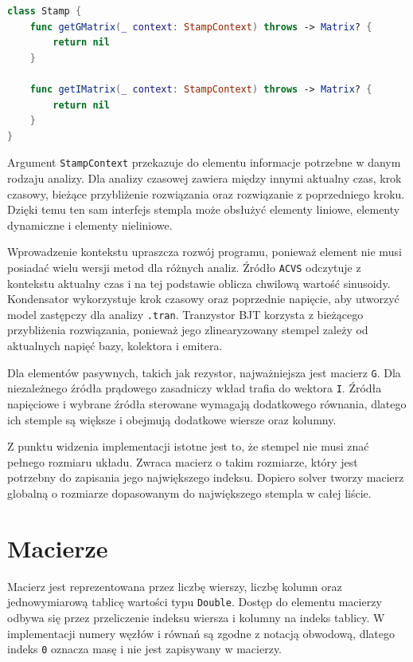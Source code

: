 \begin{lstlisting}[language=Swift,caption={Wspólny interfejs stempla},label={lst:stamp-interface}]
class Stamp {
    func getGMatrix(_ context: StampContext) throws -> Matrix? {
        return nil
    }

    func getIMatrix(_ context: StampContext) throws -> Matrix? {
        return nil
    }
}
\end{lstlisting}

Argument \texttt{StampContext} przekazuje do elementu informacje potrzebne w danym rodzaju analizy. Dla analizy czasowej zawiera między innymi aktualny czas, krok czasowy, bieżące przybliżenie rozwiązania oraz rozwiązanie z poprzedniego kroku. Dzięki temu ten sam interfejs stempla może obsłużyć elementy liniowe, elementy dynamiczne i elementy nieliniowe.

Wprowadzenie kontekstu upraszcza rozwój programu, ponieważ element nie musi posiadać wielu wersji metod dla różnych analiz. Źródło \texttt{ACVS} odczytuje z kontekstu aktualny czas i na tej podstawie oblicza chwilową wartość sinusoidy. Kondensator wykorzystuje krok czasowy oraz poprzednie napięcie, aby utworzyć model zastępczy dla analizy \texttt{.tran}. Tranzystor BJT korzysta z bieżącego przybliżenia rozwiązania, ponieważ jego zlinearyzowany stempel zależy od aktualnych napięć bazy, kolektora i emitera.

Dla elementów pasywnych, takich jak rezystor, najważniejsza jest macierz \texttt{G}. Dla niezależnego źródła prądowego zasadniczy wkład trafia do wektora \texttt{I}. Źródła napięciowe i wybrane źródła sterowane wymagają dodatkowego równania, dlatego ich stemple są większe i obejmują dodatkowe wiersze oraz kolumny.

Z punktu widzenia implementacji istotne jest to, że stempel nie musi znać pełnego rozmiaru układu. Zwraca macierz o takim rozmiarze, który jest potrzebny do zapisania jego największego indeksu. Dopiero solver tworzy macierz globalną o rozmiarze dopasowanym do największego stempla w całej liście.

\section{Macierze}
\label{sec:implementacja-macierze}

Macierz jest reprezentowana przez liczbę wierszy, liczbę kolumn oraz jednowymiarową tablicę wartości typu \texttt{Double}. Dostęp do elementu macierzy odbywa się przez przeliczenie indeksu wiersza i kolumny na indeks tablicy. W implementacji numery węzłów i równań są zgodne z notacją obwodową, dlatego indeks \texttt{0} oznacza masę i nie jest zapisywany w macierzy.

